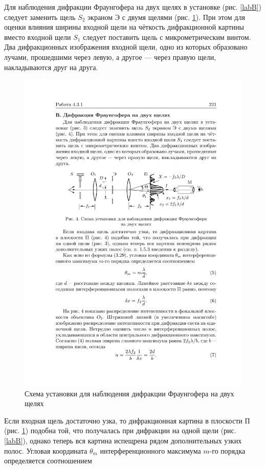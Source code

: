 \documentclass[a4paper, 12pt]{article}%
\begin{document}
 	Для наблюдения дифракции Фраунгофера на двух щелях в установке (рис. \ref{labB}) следует заменить щель $ S_2 $ экраном Э с двумя щелями
 	(рис. \ref{labC}). При этом для оценки влияния ширины входной щели на чёткость дифракционной картины вместо входной щели $ S_1 $ следует поставить щель с микрометрическим винтом. Два дифракционных изображения входной щели, одно из которых образовано лучами, прошедшими через левую, а другое --- через правую щели, накладываются друг на друга.
 	
 	\begin{figure}[h!]
 		\centering
 		\includegraphics[width=0.8\linewidth]{c.pdf}
 		\caption{Схема установки для наблюдения дифракции Фраунгофера на двух щелях}
 		\label{labC}
 	\end{figure}
 	
 	Если входная щель достаточно узка, то дифракционная картина
 	в плоскости П (рис. \ref{labC}) подобна той, что получалась при дифракции
 	на одной щели (рис. \ref{labB}), однако теперь вся картина испещрена рядом
 	дополнительных узких полос.
 	Угловая координата $ \theta_m $ интерференционного максимума $ m $-го порядка определяется соотношением
 	
\end{document}
